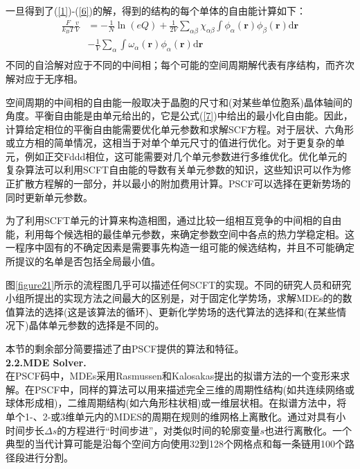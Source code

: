 \documentclass[12pt,a4paper]{article}
\begin{document}
一旦得到了(\ref{1})-(\ref{6})的解，得到的结构的每个单体的自由能计算如下：
\begin{equation}\label{7}
\begin{aligned}
\frac{F}{k_BT}\frac{v}{V} & =  -\frac{1}{N}\ln (eQ)+\frac{1}{2V}\sum _{\alpha \beta} \chi_{\alpha \beta}\int \phi_{\alpha}(\mathbf{r})\phi_{\beta}(\mathbf{r}) \mathrm{d}\mathbf{r}\\
& - \frac{1}{V}\sum _{\alpha} \int \omega_{\alpha}(\mathbf{r})\phi_{\alpha}(\mathbf{r})\mathrm{d}\mathbf{r}\\
\end{aligned}
\end{equation}
不同的自洽解对应于不同的中间相；每个可能的空间周期解代表有序结构，而齐次解对应于无序相。

空间周期的中间相的自由能一般取决于晶胞的尺寸和(对某些单位胞系)晶体轴间的角度。平衡自由能是由单元给出的，它是公式(\ref{7})中给出的最小化自由能。因此，计算给定相位的平衡自由能需要优化单元参数和求解SCF方程。对于层状、六角形或立方相的简单情况，这相当于对单个单元尺寸的值进行优化。对于更复杂的单元，例如正交Fddd相位，这可能需要对几个单元参数进行多维优化。优化单元的复杂算法可以利用SCFT自由能的导数有关单元参数的知识，这些知识可以作为修正扩散方程解的一部分，并以最小的附加费用计算。PSCF可以选择在更新势场的同时更新单元参数。

为了利用SCFT单元的计算来构造相图，通过比较一组相互竞争的中间相的自由能，利用每个候选相的最佳单元参数，来确定参数空间中各点的热力学稳定相。这一程序中固有的不确定因素是需要事先构造一组可能的候选结构，并且不可能确定所提议的名单是否包括全局最小值。

图\ref{figure21}所示的流程图几乎可以描述任何SCFT的实现。不同的研究人员和研究小组所提出的实现方法之间最大的区别是，对于固定化学势场，求解MDEs的的数值算法的选择(这是该算法的循环)、更新化学势场的迭代算法的选择和(在某些情况下)晶体单元参数的选择是不同的。

本节的剩余部分简要描述了由PSCF提供的算法和特征。\\
\textbf{2.2.MDE Solver.}\\
在PSCF码中，MDEs采用Rasmussen和Kalosakas提出的拟谱方法的一个变形来求解。在PSCF中，同样的算法可以用来描述完全三维的周期性结构(如共连续网络或球体形成相)，二维周期结构(如六角形柱状相)或一维层状相。在拟谱方法中，将单个1-、2-或3维单元内的MDES的周期在规则的维网格上离散化。通过对具有小时间步长$\Delta s$的方程进行“时间步进”，对类似时间的轮廓变量$s$也进行离散化。一个典型的当代计算可能是沿每个空间方向使用32到128个网格点和每一条链用100个路径段进行分割。
\end{document}
